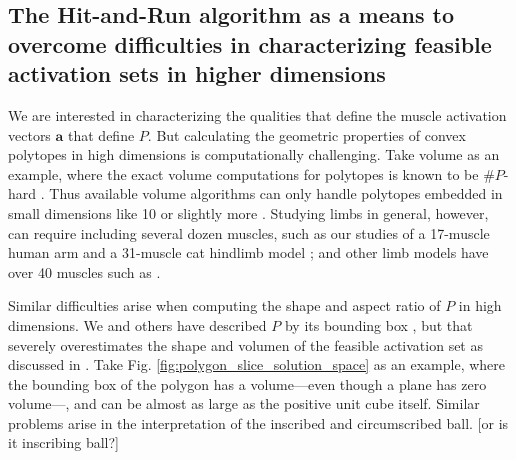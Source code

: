 \subsection*{The Hit-and-Run algorithm as a means to overcome difficulties in characterizing feasible activation sets  in higher dimensions}
\label{ss:hitrun}
We are interested in characterizing the qualities that define the muscle activation vectors $\textbf{a}$ that define $P$. But calculating the geometric properties of convex polytopes in high dimensions is computationally challenging. Take volume as an example, where the exact volume computations for polytopes is known to be $\#P$-hard \cite{Dyer}.
Thus available volume algorithms  can only handle polytopes embedded in small dimensions like 10 or slightly more \cite{Bueler2}.   Studying limbs in general, however, can require including  several dozen muscles, such as our studies of a 17-muscle human arm and a 31-muscle cat hindlimb model \cite{Valero-Cuevas2015high-dimensional}; and other limb models have over 40 muscles such as  \cite{arnold2010model, kutch2012challenges, hamner2010muscle, de2014human}.

Similar difficulties arise when computing the shape and aspect ratio of $P$ in high dimensions. We and others  have described $P$ by its bounding box  \cite{sohn2013cat_bounding_box,kutch2011muscle}, but  that  severely overestimates the shape and volumen of the feasible activation set as discussed in \cite{Valero-Cuevas2015high-dimensional}. Take Fig. \ref{fig:polygon_slice_solution_space} as an example, where the bounding box of the polygon has a volume---even though a plane has zero volume---, and can be almost as large as the positive unit cube itself. Similar problems arise in the interpretation of the inscribed and circumscribed ball. [or is it inscribing ball?]


